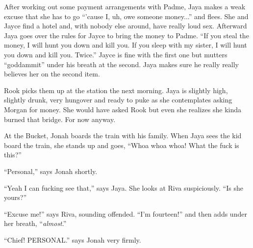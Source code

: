 

After working out some payment arrangements with Padme, Jaya makes a weak excuse that she has to go ``'cause I, uh, owe someone money...'' and flees.  She and Jayce find a hotel and, with nobody else around, have really loud sex.  Afterward Jaya goes over the rules for Jayce to bring the money to Padme.  ``If you steal the money, I will hunt you down and kill you.  If you sleep with my sister, I will hunt you down and kill you.  Twice.''  Jayce is fine with the first one but mutters ``goddammit'' under his breath at the second.  Jaya makes sure he really really believes her on the second item.



Rook picks them up at the station the next morning.  Jaya is slightly high, slightly drunk, very hungover and ready to puke as she contemplates asking Morgan for money.  She would have asked Rook but even she realizes she kinda burned that bridge. For now anyway.



At the Bucket, Jonah boards the train with his family.  When Jaya sees the kid board the train, she stands up and goes, ``Whoa whoa whoa!  What the fuck is this?''

``Personal,'' says Jonah shortly.

``Yeah I can fucking see that,'' says Jaya.  She looks at Riva suspiciously.  ``Is she yours?''

``Excuse me!'' says Riva, sounding offended.  ``I'm fourteen!'' and then adds under her breath, ``\textit{almost}.''

``Chief!  PERSONAL.'' says Jonah very firmly.

